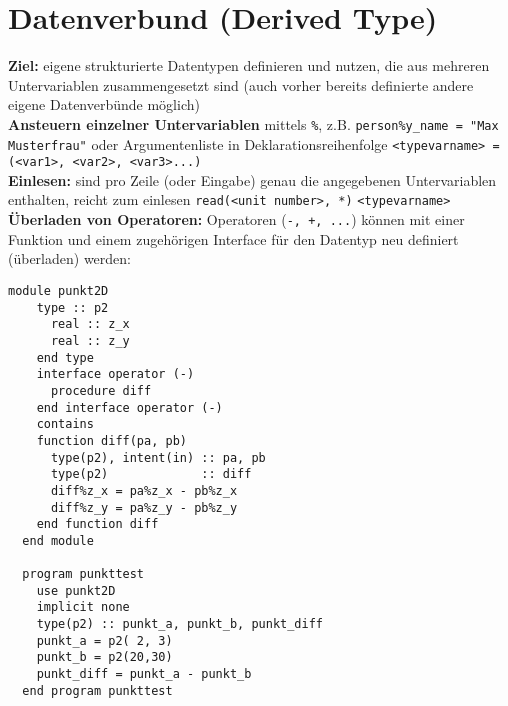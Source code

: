\documentclass[a4paper, twocolumn]{scrarticle}
\begin{document}
\section{Datenverbund (Derived Type)}\label{sec:datenverbund}
\textbf{Ziel:} eigene strukturierte Datentypen definieren und nutzen, die aus mehreren Untervariablen zusammengesetzt sind (auch vorher bereits definierte andere eigene Datenverbünde möglich)\\
\textbf{Ansteuern einzelner Untervariablen} mittels \lstinline|%|, z.B. \lstinline|person%y_name = "Max Musterfrau"| oder Argumentenliste in Deklarationsreihenfolge \lstinline|<typevarname> = (<var1>, <var2>, <var3>...)|\\
\textbf{Einlesen:} sind pro Zeile (oder Eingabe) genau die angegebenen Untervariablen enthalten, reicht zum einlesen \lstinline|read(<unit number>, *)| \lstinline|<typevarname>|\\
\textbf{Überladen von Operatoren:} Operatoren (\lstinline|-, +, ...|) können mit einer Funktion und einem zugehörigen Interface für den Datentyp neu definiert (\glqq überladen\grqq) werden:
\begin{lstlisting}[caption={Beispiel Nutzung eigener Datentypen inklusive Überladung}]
  module punkt2D
    type :: p2
	  real :: z_x
	  real :: z_y
    end type
	interface operator (-)
	  procedure diff
	end interface operator (-)
	contains
	function diff(pa, pb)
	  type(p2), intent(in) :: pa, pb
	  type(p2)             :: diff
	  diff%z_x = pa%z_x - pb%z_x
	  diff%z_y = pa%z_y - pb%z_y
	end function diff
  end module
	
  program punkttest
	use punkt2D
	implicit none
	type(p2) :: punkt_a, punkt_b, punkt_diff
	punkt_a = p2( 2, 3)
	punkt_b = p2(20,30)
	punkt_diff = punkt_a - punkt_b
  end program punkttest
\end{lstlisting}
\end{document}
